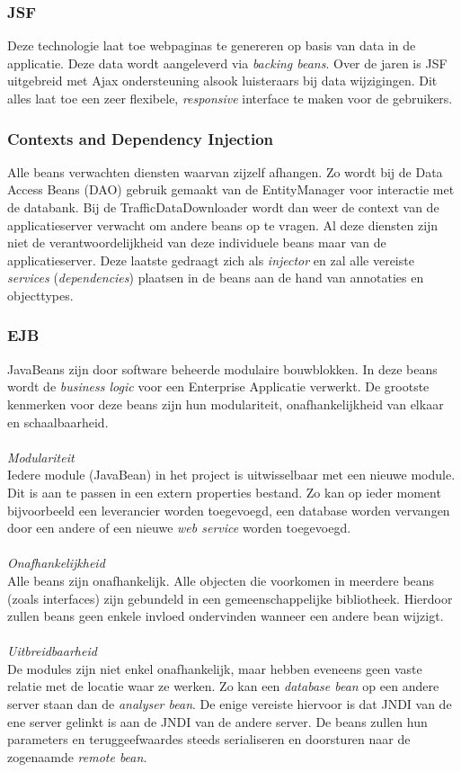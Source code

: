 \documentclass[ps,a4paper,oneside]{report}
\begin{document}
\subsubsection{JSF}
Deze technologie laat toe webpaginas te genereren op basis van data in de applicatie. Deze data wordt aangeleverd via \textit{backing beans}. Over de jaren is JSF uitgebreid met Ajax ondersteuning alsook luisteraars bij data wijzigingen. Dit alles laat toe een zeer flexibele, \textit{responsive} interface te maken voor de gebruikers.
\subsubsection{Contexts and Dependency Injection}
Alle beans verwachten diensten waarvan zijzelf afhangen. Zo wordt bij de Data Access Beans (DAO) gebruik gemaakt van de EntityManager voor interactie met de databank. Bij de TrafficDataDownloader wordt dan weer de context van de applicatieserver verwacht om andere beans op te vragen. Al deze diensten zijn niet de verantwoordelijkheid van deze individuele beans maar van de applicatieserver. Deze laatste gedraagt zich als \textit{injector} en zal alle vereiste \textit{services} (\textit{dependencies}) plaatsen in de beans aan de hand van annotaties en objecttypes.
\subsubsection{EJB}
JavaBeans zijn door software beheerde modulaire bouwblokken. In deze beans wordt de \textit{business logic} voor een Enterprise Applicatie verwerkt. De grootste kenmerken voor deze beans zijn hun modulariteit, onafhankelijkheid van elkaar en schaalbaarheid.\\\\
\textit{Modulariteit}\\
Iedere module (JavaBean) in het project is uitwisselbaar met een nieuwe module. Dit is aan te passen in een extern properties bestand. Zo kan op ieder moment bijvoorbeeld een leverancier worden toegevoegd, een database worden vervangen door een andere of een nieuwe \textit{web service} worden toegevoegd.\\\\
\textit{Onafhankelijkheid}\\
Alle beans zijn onafhankelijk. Alle objecten die voorkomen in meerdere beans (zoals interfaces) zijn gebundeld in een gemeenschappelijke bibliotheek. Hierdoor zullen beans geen enkele invloed ondervinden wanneer een andere bean wijzigt.\\\\
\textit{Uitbreidbaarheid}\\
De modules zijn niet enkel onafhankelijk, maar hebben eveneens geen vaste relatie met de locatie waar ze werken. Zo kan een \textit{database bean} op een andere server staan dan de \textit{analyser bean}. De enige vereiste hiervoor is dat JNDI van de ene server gelinkt is aan de JNDI van de andere server. De beans zullen hun parameters en teruggeefwaardes steeds serialiseren en doorsturen naar de zogenaamde \textit{remote bean}.
\end{document}
